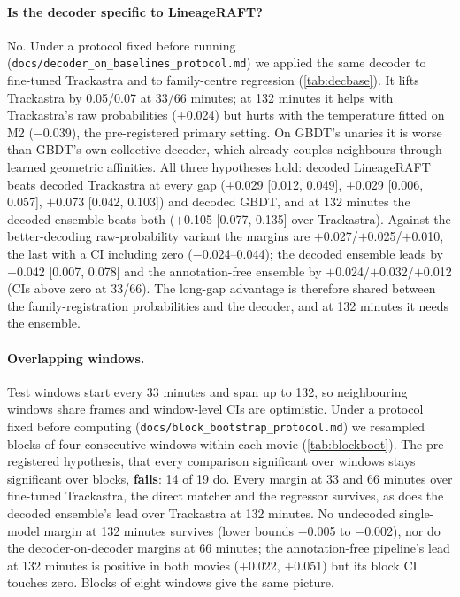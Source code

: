 \documentclass[10pt,twocolumn,letterpaper]{article}
\newcommand{\ours}{LineageRAFT\xspace}
\begin{document}
\paragraph{Is the decoder specific to \ours?}
No. Under a protocol fixed before running (\texttt{docs/decoder\_on\_baselines\_protocol.md}) we applied the same decoder to fine-tuned Trackastra and to family-centre regression (\cref{tab:decbase}).
It lifts Trackastra by 0.05/0.07 at 33/66 minutes; at 132 minutes it helps with Trackastra's raw probabilities ($+$0.024) but hurts with the temperature fitted on M2 ($-$0.039), the pre-registered primary setting.
On GBDT's unaries it is worse than GBDT's own collective decoder, which already couples neighbours through learned geometric affinities.
All three hypotheses hold: decoded \ours beats decoded Trackastra at every gap ($+$0.029 [0.012, 0.049], $+$0.029 [0.006, 0.057], $+$0.073 [0.042, 0.103]) and decoded GBDT, and at 132 minutes the decoded ensemble beats both ($+$0.105 [0.077, 0.135] over Trackastra).
Against the better-decoding raw-probability variant the margins are $+$0.027/$+$0.025/$+$0.010, the last with a CI including zero ($-$0.024--0.044); the decoded ensemble leads by $+$0.042 [0.007, 0.078] and the annotation-free ensemble by $+$0.024/$+$0.032/$+$0.012 (CIs above zero at 33/66).
The long-gap advantage is therefore shared between the family-registration probabilities and the decoder, and at 132 minutes it needs the ensemble.


\paragraph{Overlapping windows.}
Test windows start every 33 minutes and span up to 132, so neighbouring windows share frames and window-level CIs are optimistic.
Under a protocol fixed before computing (\texttt{docs/block\_bootstrap\_protocol.md}) we resampled blocks of four consecutive windows within each movie (\cref{tab:blockboot}).
The pre-registered hypothesis, that every comparison significant over windows stays significant over blocks, \textbf{fails}: 14 of 19 do.
Every margin at 33 and 66 minutes over fine-tuned Trackastra, the direct matcher and the regressor survives, as does the decoded ensemble's lead over Trackastra at 132 minutes.
No undecoded single-model margin at 132 minutes survives (lower bounds $-$0.005 to $-$0.002), nor do the decoder-on-decoder margins at 66 minutes; the annotation-free pipeline's lead at 132 minutes is positive in both movies ($+$0.022, $+$0.051) but its block CI touches zero.
Blocks of eight windows give the same picture.

\end{document}
